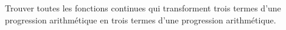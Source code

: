 Trouver toutes les fonctions continues qui transforment trois termes d'une progression arithmétique en trois termes d'une progression arithmétique.
